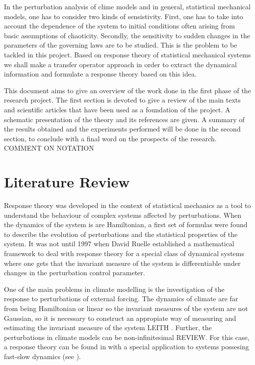 
\noindent In the perturbation analysis of clime models and in general, statistical mechanical models, one has to consider two kinds of sensistivity. First, one has to take into account the dependence of the system to initial conditions often arising from basic assumptions of chaoticity. Secondly, the sensitivity to sudden changes in the parameters of the governing laws are to be studied. This is the problem to be tackled in this project. Based on response theory of statistical mechanical systems we shall make a transfer operator approach in order to extract the dynamical information and formulate a response theory based on this idea.

This document aims to give an overview of the work done in the first phase of the research project. The first section is devoted to give a review of the main texts and scientific articles that have been used as a foundation of the project. A schematic presentation of the theory and its references are given. A summary of the results obtained and the experiments performed will be done in the second section, to conclude with a final word on the prospects of the research.
COMMENT ON NOTATION


\section*{Literature Review}

Response theory was developed in the context of statistical mechanics as a tool to understand the behaviour of complex systems affected by perturbations. When the dynamics of the system is are Hamiltonian, a first set of formulas were found \cite{kubo} to describe the evolution of perturbations and the statistical properties of the system. It was not until 1997 when David Ruelle \cite{ruelle} established a mathematical framework to deal with response theory for a special class of dynamical systems where one gets that the invariant measure of the system is differentiable under changes in the perturbation control parameter.

One of the main problems in climate modelling is the investigation of the response to perturbations of external forcing. The dynamics of climate are far from being Hamiltonian or linear so the invariant measures of the system are not Gaussian, so it is necessary to construct an appropiate way of measuring and estimating the invariant measure of the system LEITH \cite{review}. Further, the perturbations in climate models can be non-infinitesimal REVIEW. For this case, a response theory can be found in \cite{vulpiani} with a special application to systems possesing fast-slow dynamics (see \cite{lacorata}).

